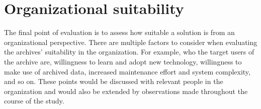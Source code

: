 \section{Organizational suitability}
The final point of evaluation is to assess how suitable a solution is from an organizational perspective. There are multiple factors to consider when evaluating the archives' suitability in the organization. For example, who the target users of the archive are, willingness to learn and adopt new technology, willingness to make use of archived data, increased maintenance effort and system complexity, and so on. These points would be discussed with relevant people in the organization and would also be extended by observations made throughout the course of the study.


